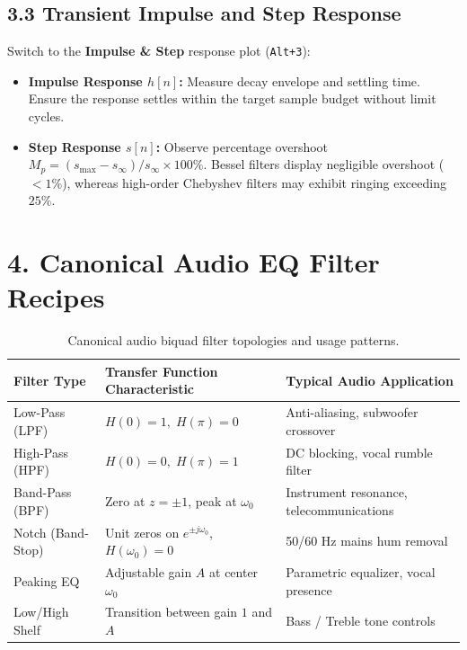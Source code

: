 \documentclass[11pt,a4paper]{article}
\begin{document}
\subsection*{3.3 Transient Impulse and Step Response}
Switch to the \textbf{Impulse \& Step} response plot (\texttt{Alt+3}):
\begin{itemize}[leftmargin=20pt,itemsep=2pt]
\item \textbf{Impulse Response $h[n]$:} Measure decay envelope and settling time. Ensure the response settles within the target sample budget without limit cycles.
\item \textbf{Step Response $s[n]$:} Observe percentage overshoot $M_p = (s_{\max} - s_{\infty})/s_{\infty} \times 100\%$. Bessel filters display negligible overshoot ($< 1\%$), whereas high-order Chebyshev filters may exhibit ringing exceeding $25\%$.
\end{itemize}

\section*{4. Canonical Audio EQ Filter Recipes}
\begin{table}[h!]
\centering
\small
\renewcommand{\arraystretch}{1.15}
\begin{tabular}{lll}
\toprule
\textbf{Filter Type} & \textbf{Transfer Function Characteristic} & \textbf{Typical Audio Application} \\
\midrule
Low-Pass (LPF) & $H(0) = 1, \; H(\pi) = 0$ & Anti-aliasing, subwoofer crossover \\
High-Pass (HPF) & $H(0) = 0, \; H(\pi) = 1$ & DC blocking, vocal rumble filter \\
Band-Pass (BPF) & Zero at $z = \pm 1$, peak at $\omega_0$ & Instrument resonance, telecommunications \\
Notch (Band-Stop) & Unit zeros on $e^{\pm j\omega_0}$, $H(\omega_0)=0$ & 50/60 Hz mains hum removal \\
Peaking EQ & Adjustable gain $A$ at center $\omega_0$ & Parametric equalizer, vocal presence \\
Low/High Shelf & Transition between gain $1$ and $A$ & Bass / Treble tone controls \\
\bottomrule
\end{tabular}
\caption{Canonical audio biquad filter topologies and usage patterns.}
\end{table}
\end{document}
